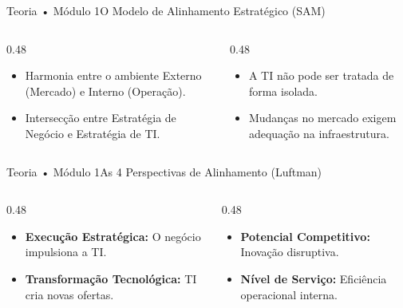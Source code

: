 \begin{senaiframe}{Teoria • Módulo 1}{O Modelo de Alinhamento Estratégico (SAM)}
  \begin{columns}[t]
    \begin{column}{0.48\textwidth}
      \begin{tcolorbox}[senaibluecard, title={Estratégia vs. Operação}]
        \begin{itemize}
          \item Harmonia entre o ambiente Externo (Mercado) e Interno (Operação).
          \item Intersecção entre Estratégia de Negócio e Estratégia de TI.
        \end{itemize}
      \end{tcolorbox}
    \end{column}
    \begin{column}{0.48\textwidth}
      \begin{tcolorbox}[senaicard, title={Henderson \& Venkatraman}]
        \begin{itemize}
          \item A TI não pode ser tratada de forma isolada.
          \item Mudanças no mercado exigem adequação na infraestrutura.
        \end{itemize}
      \end{tcolorbox}
    \end{column}
  \end{columns}
\end{senaiframe}

\begin{senaiframe}{Teoria • Módulo 1}{As 4 Perspectivas de Alinhamento (Luftman)}
  \begin{columns}[t]
    \begin{column}{0.48\textwidth}
      \begin{tcolorbox}[senaibluecard, title={Execução \& Transformação}]
        \begin{itemize}
          \item \textbf{Execução Estratégica:} O negócio impulsiona a TI.
          \item \textbf{Transformação Tecnológica:} TI cria novas ofertas.
        \end{itemize}
      \end{tcolorbox}
    \end{column}
    \begin{column}{0.48\textwidth}
      \begin{tcolorbox}[senaiambercard, title={Competição \& Serviços}]
        \begin{itemize}
          \item \textbf{Potencial Competitivo:} Inovação disruptiva.
          \item \textbf{Nível de Serviço:} Eficiência operacional interna.
        \end{itemize}
      \end{tcolorbox}
    \end{column}
  \end{columns}
\end{senaiframe}

